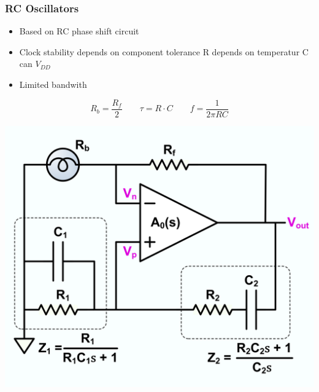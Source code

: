 \subsubsection{RC Oscillators}
\begin{minipage}{0.5\linewidth}
\begin{itemize}
    \item Based on \acs{RC} phase shift circuit
    \item Clock stability depends on component tolerance
        \subitem R depends on temperatur
        \subitem C can $ V_{DD}$
    \item Limited bandwith   
\end{itemize}
\[ R_b = \dfrac{R_f}{2} \qquad \tau=R\cdot C \qquad f = \dfrac{1}{2 \pi RC}  \]
\end{minipage}
\begin{minipage}{0.5\linewidth}
    \hspace{1cm}\includegraphics[width=0.5\linewidth]{images/RCOscillator} 
\end{minipage}

